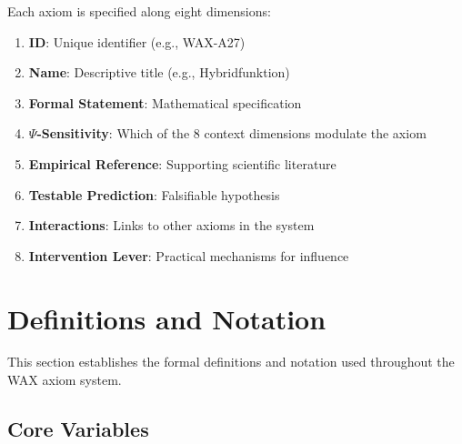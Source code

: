 Each axiom is specified along eight dimensions:

\begin{enumerate}
\item \textbf{ID}: Unique identifier (e.g., WAX-A27)
\item \textbf{Name}: Descriptive title (e.g., Hybridfunktion)
\item \textbf{Formal Statement}: Mathematical specification
\item \textbf{$\Psi$-Sensitivity}: Which of the 8 context dimensions modulate the axiom
\item \textbf{Empirical Reference}: Supporting scientific literature
\item \textbf{Testable Prediction}: Falsifiable hypothesis
\item \textbf{Interactions}: Links to other axioms in the system
\item \textbf{Intervention Lever}: Practical mechanisms for influence
\end{enumerate}






\section{Definitions and Notation}
\label{sec:av-definitions}

This section establishes the formal definitions and notation used throughout the WAX axiom system.


\subsection{Core Variables}

